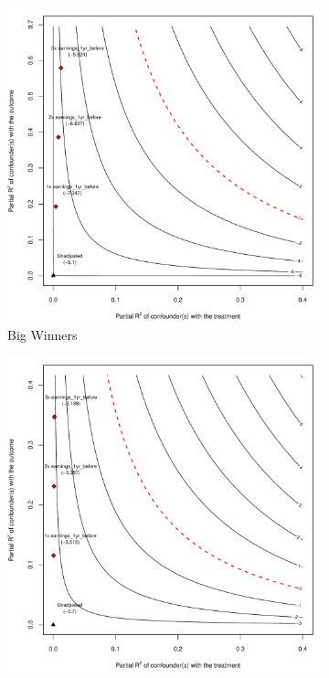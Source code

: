 \documentclass[letterpaper,12pt,leqno]{article}
\begin{document}
\begin{figure}[!ht]
    \caption{Sensitivity Analyses for the Lottery Example}\label{fig:sens.irs}
    \begin{minipage}[c]{1\textwidth}
        \centering
        \begin{subfigure}{0.45\linewidth}
            \includegraphics[width=\linewidth]{irs1_sens.pdf}
            \caption{Big Winners}
        \end{subfigure}\hspace{1em}
        \begin{subfigure}{0.45\linewidth}
            \includegraphics[width=\linewidth]{irs2_sens.pdf}

\end{subfigure}
\end{minipage}
\end{figure}
\end{document}

